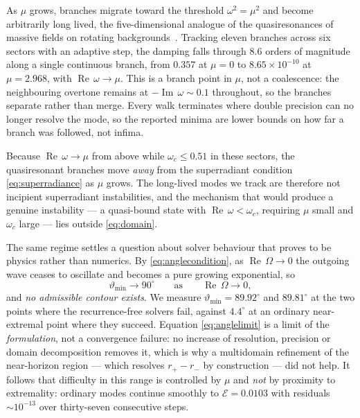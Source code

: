 \documentclass[aps,prd,reprint,superscriptaddress,nofootinbib,longbibliography]{revtex4-2}
\theoremstyle{plain}
\theoremstyle{definition}
\theoremstyle{remark}
\newcommand{\Rem}{\operatorname{Re}}
\newcommand{\Imm}{\operatorname{Im}}
\begin{document}
As $\mu$ grows, branches migrate toward the threshold $\omega^2=\mu^2$ and
become arbitrarily long lived, the five-dimensional analogue of the
quasiresonances of massive fields on rotating
backgrounds~\cite{Ponglertsakul2020A12,Lietal2023A15,Huang2025A16}. Tracking
eleven branches across six sectors with an adaptive step, the damping falls
through $8.6$ orders of magnitude along a single continuous branch, from
$0.357$ at $\mu=0$ to $8.65\times10^{-10}$ at $\mu=2.968$, with
$\Rem\,\omega\to\mu$. This is a branch point in $\mu$, not a coalescence: the
neighbouring overtone remains at $-\Imm\,\omega\sim0.1$ throughout, so the
branches separate rather than merge. Every walk terminates where double
precision can no longer resolve the mode, so the reported minima are lower
bounds on how far a branch was followed, not infima.

Because $\Rem\,\omega\to\mu$ from above while $\omega_c\le0.51$ in these
sectors, the quasiresonant branches move \emph{away} from the superradiant
condition \eqref{eq:superradiance} as $\mu$ grows. The long-lived modes we track
are therefore not incipient superradiant instabilities, and the mechanism that
would produce a genuine instability --- a quasi-bound state with
$\Rem\,\omega<\omega_c$, requiring $\mu$ small and $\omega_c$ large --- lies
outside \eqref{eq:domain}.

The same regime settles a question about solver behaviour that proves to be
physics rather than numerics. By \eqref{eq:anglecondition}, as
$\Rem\,\Omega\to0$ the outgoing wave ceases to oscillate and becomes a pure
growing exponential, so
\begin{equation}\label{eq:anglelimit}
  \vartheta_{\min}\longrightarrow90^\circ
  \qquad\text{as}\qquad \Rem\,\Omega\to0,
\end{equation}
and \emph{no admissible contour exists}. We measure
$\vartheta_{\min}=89.92^\circ$ and $89.81^\circ$ at the two points where the
recurrence-free solvers fail, against $4.4^\circ$ at an ordinary near-extremal
point where they succeed. Equation \eqref{eq:anglelimit} is a limit of the
\emph{formulation}, not a convergence failure: no increase of resolution,
precision or domain decomposition removes it, which is why a multidomain
refinement of the near-horizon region --- which resolves $r_+-r_-$ by
construction --- did not help. It follows that difficulty in this range is
controlled by $\mu$ and \emph{not} by proximity to extremality: ordinary modes
continue smoothly to $\mathcal{E}=0.0103$ with residuals $\sim10^{-13}$ over
thirty-seven consecutive steps.
\end{document}
